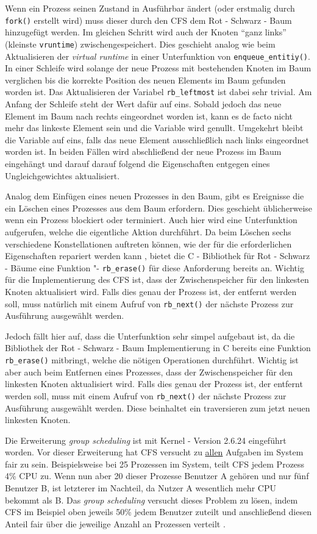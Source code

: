 Wenn ein Prozess seinen Zustand in Ausführbar ändert (oder erstmalig durch \texttt{fork()} erstellt wird) muss dieser durch den CFS dem Rot - Schwarz - Baum hinzugefügt werden. Im gleichen Schritt wird auch der Knoten ``ganz links'' (kleinste \texttt{vruntime}) zwischengespeichert. Dies geschieht analog wie beim Aktualisieren der \textit{virtual runtime} in einer Unterfunktion von \texttt{enqueue\_entitiy()}. In einer Schleife wird solange der neue Prozess mit bestehenden Knoten im Baum verglichen bis die korrekte Position des neuen Elements im Baum gefunden worden ist. Das Aktualisieren der Variabel \texttt{rb\_leftmost} ist dabei sehr trivial. Am Anfang der Schleife steht der Wert dafür auf eins. Sobald jedoch das neue Element im Baum nach rechts eingeordnet worden ist, kann es de facto nicht mehr das linkeste Element sein und die Variable wird genullt. Umgekehrt bleibt die Variable auf eins, falls das neue Element ausschließlich nach links eingeordnet worden ist. 
In beiden Fällen wird abschließend der neue Prozess im Baum eingehängt und darauf darauf folgend die Eigenschaften entgegen eines Ungleichgewichtes aktualisiert.

Analog dem Einfügen eines neuen Prozesses in den Baum, gibt es Ereignisse die ein Löschen eines Prozesses aus dem Baum erfordern. Dies geschieht üblicherweise wenn ein Prozess blockiert oder terminiert. Auch hier wird eine Unterfunktion aufgerufen, welche die eigentliche Aktion durchführt.
Da beim Löschen sechs verschiedene Konstellationen auftreten können, wie der für die erforderlichen Eigenschaften repariert werden kann \cite{tcormen}, bietet die C - Bibliothek für Rot - Schwarz - Bäume eine Funktion "- \texttt{rb\_erase()} für diese Anforderung bereits an. Wichtig für die Implementierung des CFS ist, dass der Zwischenspeicher für den linkesten Knoten aktualisiert wird. Falls dies genau der Prozess ist, der entfernt werden soll, muss natürlich mit einem Aufruf von \texttt{rb\_next()} der nächste Prozess zur Ausführung ausgewählt werden. 

Jedoch fällt hier auf, dass die Unterfunktion sehr simpel aufgebaut ist, da die Bibliothek der Rot - Schwarz - Baum Implementierung in C bereits eine Funktion \texttt{rb\_erase()} mitbringt, welche die nötigen Operationen durchführt. Wichtig ist aber auch beim Entfernen eines Prozesses, dass der Zwischenspeicher für den linkesten Knoten aktualisiert wird. Falls dies genau der Prozess ist, der entfernt werden soll, muss mit einem Aufruf von \texttt{rb\_next()} der nächste Prozess zur Ausführung ausgewählt werden. Diese beinhaltet ein traversieren zum jetzt neuen linkesten Knoten.

Die Erweiterung \textit{group scheduling} ist mit Kernel - Version 2.6.24 eingeführt worden. Vor dieser Erweiterung hat CFS versucht zu \underline{allen} Aufgaben im System fair zu sein. Beispielsweise bei 25 Prozessen im System, teilt CFS jedem Prozess 4\% CPU zu. Wenn nun aber 20 dieser Prozesse Benutzer A gehören und nur fünf Benutzer B, ist letzterer im Nachteil, da Nutzer A wesentlich mehr CPU bekommt als B. Das \textit{group scheduling} versucht dieses Problem zu lösen, indem CFS im Beispiel oben jeweils 50\% jedem Benutzer zuteilt und anschließend diesen Anteil fair über die jeweilige Anzahl an Prozessen verteilt \cite{cpabla}. 
